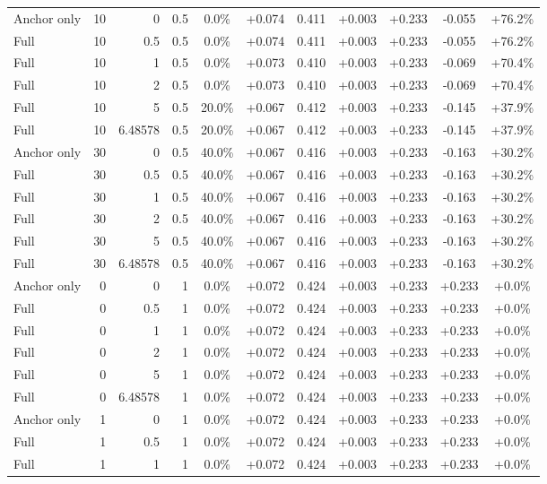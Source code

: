 \begin{table}[htbp]
\begin{tabular}{lrrrccccccc}
Anchor only & 10 & 0 & 0.5 & 0.0\% & +0.074 & 0.411 & +0.003 & +0.233 & -0.055 & +76.2\% \\
Full & 10 & 0.5 & 0.5 & 0.0\% & +0.074 & 0.411 & +0.003 & +0.233 & -0.055 & +76.2\% \\
Full & 10 & 1 & 0.5 & 0.0\% & +0.073 & 0.410 & +0.003 & +0.233 & -0.069 & +70.4\% \\
Full & 10 & 2 & 0.5 & 0.0\% & +0.073 & 0.410 & +0.003 & +0.233 & -0.069 & +70.4\% \\
Full & 10 & 5 & 0.5 & 20.0\% & +0.067 & 0.412 & +0.003 & +0.233 & -0.145 & +37.9\% \\
Full & 10 & 6.48578 & 0.5 & 20.0\% & +0.067 & 0.412 & +0.003 & +0.233 & -0.145 & +37.9\% \\
Anchor only & 30 & 0 & 0.5 & 40.0\% & +0.067 & 0.416 & +0.003 & +0.233 & -0.163 & +30.2\% \\
Full & 30 & 0.5 & 0.5 & 40.0\% & +0.067 & 0.416 & +0.003 & +0.233 & -0.163 & +30.2\% \\
Full & 30 & 1 & 0.5 & 40.0\% & +0.067 & 0.416 & +0.003 & +0.233 & -0.163 & +30.2\% \\
Full & 30 & 2 & 0.5 & 40.0\% & +0.067 & 0.416 & +0.003 & +0.233 & -0.163 & +30.2\% \\
Full & 30 & 5 & 0.5 & 40.0\% & +0.067 & 0.416 & +0.003 & +0.233 & -0.163 & +30.2\% \\
Full & 30 & 6.48578 & 0.5 & 40.0\% & +0.067 & 0.416 & +0.003 & +0.233 & -0.163 & +30.2\% \\
Anchor only & 0 & 0 & 1 & 0.0\% & +0.072 & 0.424 & +0.003 & +0.233 & +0.233 & +0.0\% \\
Full & 0 & 0.5 & 1 & 0.0\% & +0.072 & 0.424 & +0.003 & +0.233 & +0.233 & +0.0\% \\
Full & 0 & 1 & 1 & 0.0\% & +0.072 & 0.424 & +0.003 & +0.233 & +0.233 & +0.0\% \\
Full & 0 & 2 & 1 & 0.0\% & +0.072 & 0.424 & +0.003 & +0.233 & +0.233 & +0.0\% \\
Full & 0 & 5 & 1 & 0.0\% & +0.072 & 0.424 & +0.003 & +0.233 & +0.233 & +0.0\% \\
Full & 0 & 6.48578 & 1 & 0.0\% & +0.072 & 0.424 & +0.003 & +0.233 & +0.233 & +0.0\% \\
Anchor only & 1 & 0 & 1 & 0.0\% & +0.072 & 0.424 & +0.003 & +0.233 & +0.233 & +0.0\% \\
Full & 1 & 0.5 & 1 & 0.0\% & +0.072 & 0.424 & +0.003 & +0.233 & +0.233 & +0.0\% \\
Full & 1 & 1 & 1 & 0.0\% & +0.072 & 0.424 & +0.003 & +0.233 & +0.233 & +0.0\% \\

\end{tabular}
\end{table}
